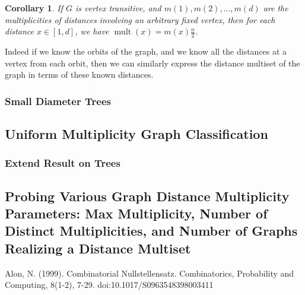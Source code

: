 \documentclass[12]{article}
\DeclareMathOperator{\diam}{Diam}
\DeclareMathOperator{\mult}{mult}
\newtheorem{cor}[thm]{Corollary}
\theoremstyle{definition}
\begin{document}
	\begin{cor}
		If $G$ is vertex transitive, and $m(1), m(2), \ldots, m(d)$ are the multiplicities of distances involving an arbitrary fixed vertex, then for each distance $x \in [1,d]$, we have $\mult(x) = m(x)\tfrac{n}{2}$.
	\end{cor}
	
	Indeed if we know the orbits of the graph, and we know all the distances at a vertex from each orbit, then we can similarly express the distance multiset of the graph in terms of these known distances.
	
	\subsubsection{Small Diameter Trees}
	
	\subsection{Uniform Multiplicity Graph Classification}
	\subsubsection{Extend Result on Trees}
	
	\subsection{Probing Various Graph Distance Multiplicity Parameters: Max Multiplicity, Number of Distinct Multiplicities, and Number of Graphs Realizing a Distance Multiset}
	
	\newpage
	
	
	
	
	\newpage
	\begin{thebibliography}{100}
		 Alon, N. (1999). Combinatorial Nullstellensatz. Combinatorics, Probability and Computing, 8(1-2), 7-29. doi:10.1017/S0963548398003411
	\end{thebibliography}
	
\end{document}
